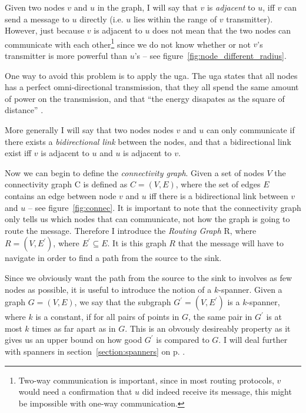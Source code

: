 Given two nodes $v$ and $u$ in the graph, I will say that $v$ is \emph{adjacent} to $u$, iff $v$ can send a message to $u$ directly (i.e. $u$ lies within the range of $v$ transmitter). However, just because $v$ is adjacent to $u$ does not mean that the two nodes can communicate with each other\footnote{Two-way communication is important, since in most routing protocols, $v$ would need a confirmation that $u$ did indeed receive its message, this might be impossible with one-way communication.} since we do not know whether or not $v$'s transmitter is more powerful than $u$'s -- see figure~\ref{fig:node_different_radius}. 

One way to avoid this problem is to apply the \ac{uga}. The \ac{uga} states that all nodes has a perfect omni-directional transmission, that they all spend the same amount of power on the transmission, and that ``the energy disapates as the square of distance'' \cite{practical}.

More generally I will say that two nodes nodes $v$ and $u$ can only communicate if there exists a \emph{bidirectional link} between the nodes, and that a bidirectional link exist iff $v$ is adjacent to $u$ and $u$ is adjacent to $v$.


Now we can begin to define the \emph{connectivity graph}. Given a set of nodes $V$ the connectivity graph C is defined as $C = (V, E)$, where the set of edges $E$ contains an edge between node $v$ and $u$ iff there is a bidirectional link between $v$ and $u$ -- see figure~\ref{fig:connec}. It is important to note that the connectivity graph only tells us which nodes that can communicate, not how the graph is going to route the message. Therefore I introduce the \emph{Routing Graph} R, where $R = (V, E^{\prime})$, where $E^{\prime} \subseteq E$. It is this graph $R$ that the message will have to navigate in order to find a path from the source to the sink.

Since we obviously want the path from the source to the sink to involves as few nodes as possible, it is useful to introduce the notion of a $k$-spanner. Given a graph $G = (V, E)$, we say that the subgraph $G^{\prime} = (V, E^{\prime})$ is a $k$-spanner, where $k$ is a constant, if for all pairs of points in $G$, the same pair in $G^{\prime}$ is at most $k$ times as far apart as in $G$. This is an obvously desireably property as it gives us an upper bound on how good $G^{\prime}$ is compared to $G$. I will deal further with spanners in section~\ref{section:spanners} on p. \pageref{section:spanners}.

